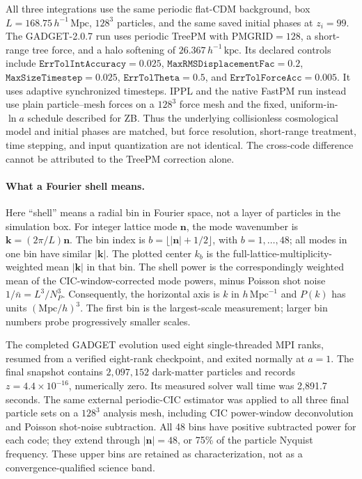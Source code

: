 All three integrations use the same periodic flat-CDM background, box
$L=168.75\,h^{-1}\,\mathrm{Mpc}$, $128^3$ particles, and the same saved initial
phases at $z_i=99$.  The GADGET-2.0.7 run uses periodic TreePM
\cite{springel2005gadget2} with
$\mathrm{PMGRID}=128$, a short-range tree force, and a halo softening of
$26.367\,h^{-1}\,\mathrm{kpc}$.  Its declared controls include
$\texttt{ErrTolIntAccuracy}=0.025$, $\texttt{MaxRMSDisplacementFac}=0.2$,
$\texttt{MaxSizeTimestep}=0.025$, $\texttt{ErrTolTheta}=0.5$, and
$\texttt{ErrTolForceAcc}=0.005$.  It uses adaptive synchronized timesteps.
IPPL and the native FastPM run instead use plain particle--mesh forces on a
$128^3$ force mesh and the fixed, uniform-in-$\ln a$ schedule described for
ZB.  Thus the underlying collisionless cosmological model and initial phases
are matched, but force resolution, short-range treatment, time stepping, and
input quantization are not identical.  The cross-code difference cannot be
attributed to the TreePM correction alone.

\paragraph{What a Fourier shell means.}
Here ``shell'' means a radial bin in Fourier space, not a layer of particles
in the simulation box.  For integer lattice mode $\boldsymbol n$, the mode
wavenumber is $\boldsymbol k=(2\pi/L)\boldsymbol n$.  The bin index is
$b=\lfloor|\boldsymbol n|+1/2\rfloor$, with $b=1,\ldots,48$; all modes in one
bin have similar $|\boldsymbol k|$.  The plotted center $k_b$ is the
full-lattice-multiplicity-weighted mean $|\boldsymbol k|$ in that bin.
The shell power is the correspondingly weighted mean of the CIC-window-corrected
mode powers, minus Poisson shot noise $1/\bar n=L^3/N_P^3$.  Consequently,
the horizontal axis is $k$ in $h\,\mathrm{Mpc}^{-1}$ and $P(k)$ has units
$(\mathrm{Mpc}/h)^3$.  The first bin is the largest-scale measurement; larger
bin numbers probe progressively smaller scales.

The completed GADGET evolution used eight single-threaded MPI ranks, resumed
from a verified eight-rank checkpoint, and exited normally at $a=1$.  The final
snapshot contains $2{,}097{,}152$ dark-matter particles and records
$z=4.4\times10^{-16}$, numerically zero.  Its measured solver wall time was
2,891.7 seconds.  The same external periodic-CIC estimator was applied to all
three final particle sets on a $128^3$ analysis mesh, including CIC power-window
deconvolution and Poisson shot-noise subtraction.  All 48 bins have positive
subtracted power for each code; they extend through $|\boldsymbol n|=48$, or
75\% of the particle Nyquist frequency.  These upper bins are retained as
characterization, not as a convergence-qualified science band.

